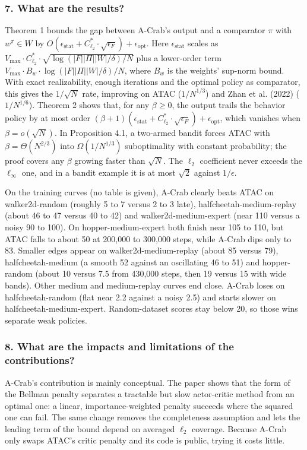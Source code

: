 \documentclass[11pt]{article}
\newcommand{\question}[1]{\subsubsection*{#1}}
\begin{document}
\question{7. What are the results?}

Theorem 1 bounds the gap between A-Crab's output and a comparator \ensuremath{\pi} with $w^{\pi}\in W$ by $O(\epsilon_{\mathrm{stat}}+C^{*}_{\ell_2}\cdot\sqrt{\epsilon_F})+\epsilon_{\mathrm{opt}}$. Here $\epsilon_{\mathrm{stat}}$ scales as $V_{\max}\cdot C^{*}_{\ell_2}\cdot\sqrt{\log(\lvert F\rvert\lvert\Pi\rvert\lvert W\rvert/\delta)/N}$ plus a lower-order term $V_{\max}\cdot B_w\cdot\log(\lvert F\rvert\lvert\Pi\rvert\lvert W\rvert/\delta)/N$, where $B_w$ is the weights' sup-norm bound. With exact realizability, enough iterations and the optimal policy as comparator, this gives the $1/\sqrt{N}$ rate, improving on ATAC ($1/N^{1/3}$) and Zhan et al. (2022) ($1/N^{1/6}$). Theorem 2 shows that, for any $\beta\ge 0$, the output trails the behavior policy by at most order $(\beta+1)(\epsilon_{\mathrm{stat}}+C^{*}_{\ell_2}\cdot\sqrt{\epsilon_F})+\epsilon_{\mathrm{opt}}$, which vanishes when $\beta=o(\sqrt{N})$. In Proposition 4.1, a two-armed bandit forces ATAC with $\beta=\Theta(N^{2/3})$ into $\Omega(1/N^{1/3})$ suboptimality with constant probability; the proof covers any \ensuremath{\beta} growing faster than $\sqrt{N}$. The $\ell_2$ coefficient never exceeds the $\ell_\infty$ one, and in a bandit example it is at most $\sqrt{2}$ against $1/\epsilon$.

On the training curves (no table is given), A-Crab clearly beats ATAC on walker2d-random (roughly 5 to 7 versus 2 to 3 late), halfcheetah-medium-replay (about 46 to 47 versus 40 to 42) and walker2d-medium-expert (near 110 versus a noisy 90 to 100). On hopper-medium-expert both finish near 105 to 110, but ATAC falls to about 50 at 200,000 to 300,000 steps, while A-Crab dips only to 83. Smaller edges appear on walker2d-medium-replay (about 85 versus 79), halfcheetah-medium (a smooth 52 against an oscillating 46 to 51) and hopper-random (about 10 versus 7.5 from 430,000 steps, then 19 versus 15 with wide bands). Other medium and medium-replay curves end close. A-Crab loses on halfcheetah-random (flat near 2.2 against a noisy 2.5) and starts slower on halfcheetah-medium-expert. Random-dataset scores stay below 20, so those wins separate weak policies.

\question{8. What are the impacts and limitations of the contributions?}

A-Crab's contribution is mainly conceptual. The paper shows that the form of the Bellman penalty separates a tractable but slow actor-critic method from an optimal one: a linear, importance-weighted penalty succeeds where the squared one can fail. The same change removes the completeness assumption and lets the leading term of the bound depend on averaged $\ell_2$ coverage. Because A-Crab only swaps ATAC's critic penalty and its code is public, trying it costs little.
\end{document}
